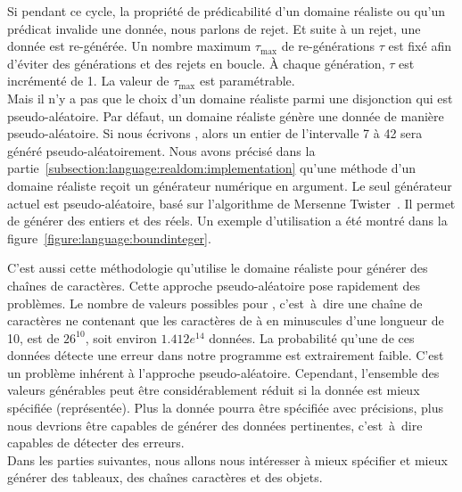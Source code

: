 Si pendant ce cycle, la propriété de prédicabilité d'un domaine réaliste ou
qu'un prédicat invalide une donnée, nous parlons de {\strong rejet}. Et suite à
un rejet, une donnée est re-générée. Un nombre maximum $\tau_\mathrm{max}$ de
re-générations $\tau$ est fixé afin d'éviter des générations et des rejets en
boucle. À chaque génération, $\tau$ est incrémenté de 1. La valeur de
$\tau_\mathrm{max}$ est paramétrable. \\

Mais il n'y a pas que le choix d'un domaine réaliste parmi une disjonction qui
est pseudo-aléatoire. Par défaut, un domaine réaliste génère une donnée de
manière pseudo-aléatoire.  Si nous écrivons , alors un
entier de l'intervalle 7 à 42 sera généré pseudo-aléatoirement. Nous avons
précisé dans la partie~\ref{subsection:language:realdom:implementation} qu'une
méthode  d'un domaine réaliste reçoit un générateur numérique en
argument. Le seul générateur actuel est pseudo-aléatoire, basé sur l'algorithme
de Mersenne Twister~. Il permet de générer des entiers et
des réels. Un exemple d'utilisation a été montré dans la
figure~\ref{figure:language:boundinteger}.

C'est aussi cette méthodologie qu'utilise le domaine réaliste  pour
générer des chaînes de caractères. Cette approche pseudo-aléatoire pose
rapidement des problèmes. Le nombre de valeurs possibles pour , c'est~à~dire une chaîne de caractères ne contenant que les caractères
de  à  en minuscules d'une longueur de 10, est de $26^{10}$,
soit environ $1.412e^{14}$ données. La probabilité qu'une de ces données détecte
une erreur dans notre programme est extrairement faible. C'est un problème
inhérent à l'approche pseudo-aléatoire. Cependant, l'ensemble des valeurs
générables peut être considérablement réduit si la donnée est mieux spécifiée
(représentée). Plus la donnée pourra être spécifiée avec précisions, plus nous
devrions être capables de générer des données pertinentes, c'est~à~dire capables
de détecter des erreurs. \\

Dans les parties suivantes, nous allons nous intéresser à mieux spécifier et
mieux générer des tableaux, des chaînes caractères et des objets.

